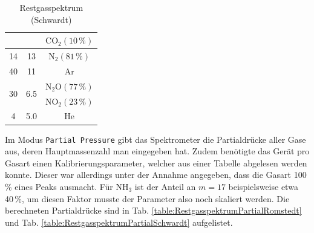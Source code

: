\documentclass[german, parskip=full]{scrartcl}
\newcommand{\tecxt}{}
\begin{document}
\begin{table}[!htp]
\begin{minipage}{0.5\textwidth}
\begin{tabular}{c|c|c}
&&$\tecxt\text{CO}_2(10\,\%)$\\ \hline
14&13&$\tecxt\text{N}_2(81\,\%)$\\ \hline
40&11&$\tecxt\text{Ar}$\\ \hline
\multirow{2}{*}{30}&\multirow{2}{*}{6.5}&$\tecxt\text{N}_2\tecxt\text{O}(77\,\%)$\\
&&$\tecxt\text{NO}_2(23\,\%)$\\ \hline
4&5.0&He\\
\end{tabular}
\caption{Restgasspektrum (Schwardt)}
\label{table:RestgasspektrumSchwardt}
\end{minipage}
\end{table}
Im Modus \texttt{Partial Pressure} gibt das Spektrometer die Partialdrücke aller Gase aus, deren Hauptmassenzahl man eingegeben hat. Zudem benötigte das Gerät pro Gasart einen Kalibrierungsparameter, welcher aus einer Tabelle abgelesen werden konnte. Dieser war allerdings unter der Annahme angegeben, dass die Gasart 100\,\% eines Peaks ausmacht. Für $\tecxt\text{NH}_3$ ist der Anteil an $m=17$ beispielsweise etwa 40\,\%, um diesen Faktor musste der Parameter also noch skaliert werden. Die berechneten Partialdrücke sind in Tab. \ref{table:RestgasspektrumPartialRomstedt} und Tab. \ref{table:RestgasspektrumPartialSchwardt} aufgelistet.
\end{document}
